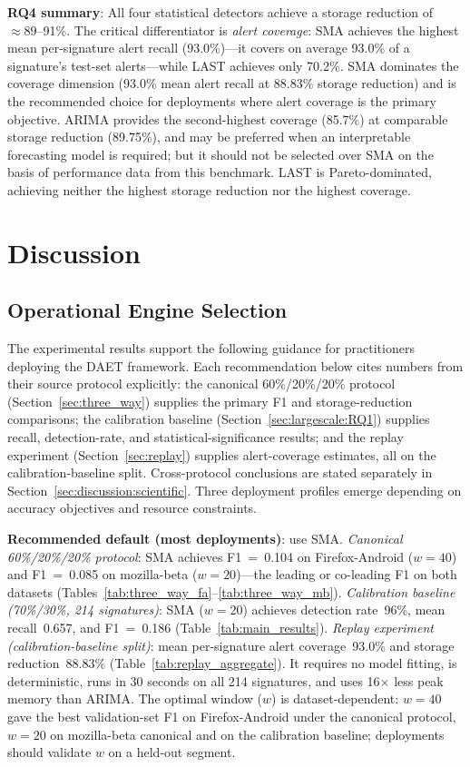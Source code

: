 \documentclass[pdflatex,sn-nature]{sn-jnl}
\theoremstyle{thmstyleone}%
\begin{document}
\textbf{RQ4 summary}: All four statistical detectors achieve a storage reduction of
$\approx 89$--91\%.
The critical differentiator is \emph{alert coverage}: SMA achieves the highest
mean per-signature alert recall (93.0\%)---it covers on average 93.0\% of a
signature's test-set alerts---while LAST achieves only 70.2\%.
SMA dominates the coverage dimension (93.0\% mean alert recall at 88.83\% storage
reduction) and is the recommended choice for deployments where alert coverage
is the primary objective.
ARIMA provides the second-highest coverage (85.7\%) at comparable storage
reduction (89.75\%), and may be preferred when an interpretable forecasting
model is required; but it should not be selected over SMA on the basis of
performance data from this benchmark.
LAST is Pareto-dominated, achieving neither the highest storage reduction
nor the highest coverage.

\section{Discussion}\label{sec:discussion}

\subsection{Operational Engine Selection}

The experimental results support the following guidance for practitioners
deploying the DAET framework.
Each recommendation below cites numbers from their source protocol explicitly:
the canonical 60\%/20\%/20\% protocol (Section~\ref{sec:three_way}) supplies
the primary F1 and storage-reduction comparisons; the calibration baseline
(Section~\ref{sec:largescale:RQ1}) supplies recall, detection-rate, and
statistical-significance results; and the replay experiment
(Section~\ref{sec:replay}) supplies alert-coverage estimates, all on the
calibration-baseline split.
Cross-protocol conclusions are stated separately in
Section~\ref{sec:discussion:scientific}.
Three deployment profiles emerge depending on accuracy objectives
and resource constraints.

\textbf{Recommended default (most deployments)}: use SMA.
\textit{Canonical 60\%/20\%/20\% protocol}: SMA achieves F1~=~0.104 on
Firefox-Android ($w=40$) and F1~=~0.085 on mozilla-beta ($w=20$)---the
leading or co-leading F1 on both datasets
(Tables~\ref{tab:three_way_fa}--\ref{tab:three_way_mb}).
\textit{Calibration baseline (70\%/30\%, 214 signatures)}: SMA ($w=20$)
achieves detection rate~96\%, mean recall~0.657, and F1~=~0.186
(Table~\ref{tab:main_results}).
\textit{Replay experiment (calibration-baseline split)}: mean per-signature
alert coverage~93.0\% and storage reduction~88.83\%
(Table~\ref{tab:replay_aggregate}).
It requires no model fitting, is deterministic, runs in 30 seconds on
all 214 signatures, and uses 16$\times$ less peak memory than ARIMA.
The optimal window ($w$) is dataset-dependent: $w=40$ gave the best
validation-set F1 on Firefox-Android under the canonical protocol, $w=20$
on mozilla-beta canonical and on the calibration baseline; deployments
should validate $w$ on a held-out segment.
\end{document}
